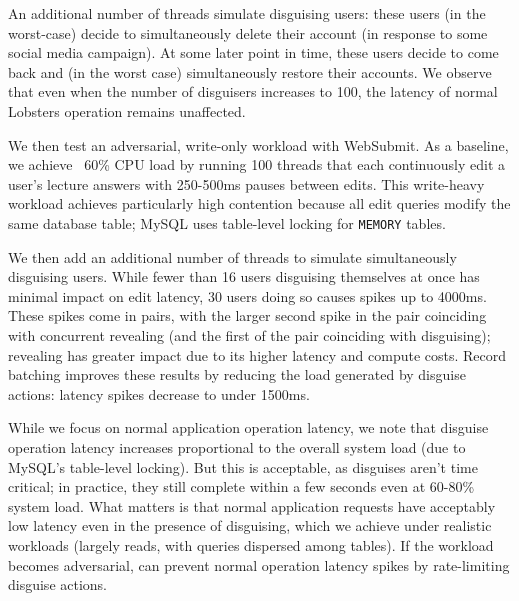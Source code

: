 An additional number of threads simulate disguising users: these users (in the worst-case) decide to
simultaneously delete their account (\eg in response to some social media campaign). At some later
point in time, these users decide to come back and (in the worst case) simultaneously restore their
accounts.
We observe that even when the number of disguisers increases to 100, the latency of normal Lobsters
operation remains unaffected.

We then test an adversarial, write-only workload with WebSubmit. As a baseline, we achieve ~60\% CPU
load by running 100 threads that each continuously edit a user's lecture answers with 250-500ms
pauses between edits. This write-heavy workload achieves particularly high contention because all
edit queries modify the same database table; MySQL uses table-level locking for \texttt{MEMORY}
tables.

We then add an additional number of threads to simulate simultaneously disguising users.  While
fewer than 16 users disguising themselves at once has minimal impact on edit latency, 30 users doing
so causes spikes up to 4000ms.  These spikes come in pairs, with the larger second spike in the pair
coinciding with concurrent revealing (and the first of the pair coinciding with disguising);
revealing has greater impact due to its higher latency and compute costs.
%
Record batching improves these results by reducing the load generated by disguise actions: latency
spikes decrease to under 1500ms.

While we focus on normal application operation latency, we note that
disguise operation latency increases proportional to the overall system load (\eg due to MySQL’s
table-level locking). But this is acceptable, as disguises aren't time critical; in practice, they
still complete within a few seconds even at 60-80\% system load.
%
What matters is that normal application requests have acceptably low latency even in the presence of
disguising, which we achieve under realistic workloads (largely reads, with queries dispersed among
tables). If the workload becomes adversarial, \sys can prevent normal operation latency spikes by
rate-limiting disguise actions.
